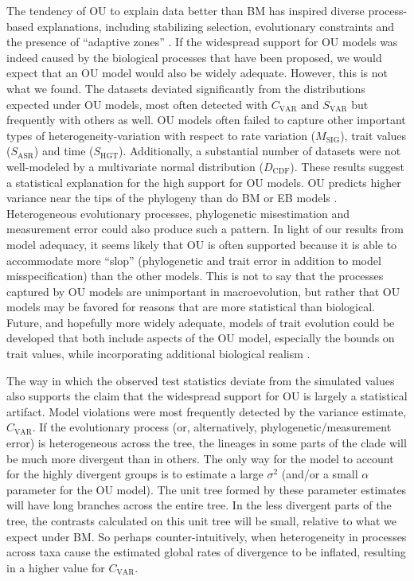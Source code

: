 The tendency of OU to explain data better than BM has inspired diverse process-based explanations, including stabilizing selection, evolutionary constraints and the presence of ``adaptive zones'' \citep{HansenMartins1996, ButlerKing2004, Hansen2012book, PennellHarmon}. 
If the widespread support for OU models was indeed caused by the biological processes that have been proposed, we would expect that an OU model would also be widely adequate. However, this is not what we found. The datasets deviated significantly from the distributions expected under OU models, most often detected with $C_{\text{VAR}}$ and $S_{\text{VAR}}$ but frequently with others as well. OU models often failed to capture other important types of heterogeneity-variation with respect to rate variation ($M_{\text{SIG}}$), trait values ($S_{\text{ASR}}$) and time ($S_{\text{HGT}}$). Additionally, a substantial number of datasets were not well-modeled by a multivariate normal distribution ($D_{\text{CDF}}$). These results suggest a statistical explanation for the high support for OU models. OU predicts higher variance near the tips of the phylogeny than do BM or EB models \citep[see figure 1 in][]{Harmon2010}. 
Heterogeneous evolutionary processes, phylogenetic misestimation and measurement error could also produce such a pattern. In light of our results from model adequacy, it seems likely that OU is often supported because it is able to accommodate more ``slop'' (phylogenetic and trait error in addition to model misspecification) than the other models.  This is not to say that the processes captured by OU models are unimportant in macroevolution, but rather that OU models may be favored for reasons that are more statistical than biological. Future, and hopefully more widely adequate, models of trait evolution could be developed that both include aspects of the OU model, especially the bounds on trait values, while incorporating additional biological realism \citep[for a recent example of such a model, see][]{NuismerHarmon}.

The way in which the observed test statistics deviate from the simulated values also supports the claim that the widespread support for OU is largely a statistical artifact. Model violations were most frequently detected by the variance estimate, $C_{\text{VAR}}$. If the evolutionary process (or, alternatively, phylogenetic/measurement error) is heterogeneous across the tree, the lineages in some parts of the clade will be much more divergent than in others. The only way for the model to account for the highly divergent groups is to estimate a large $\sigma^2$ (and/or a small $\alpha$ parameter for the OU model). The unit tree formed by these parameter estimates will have long branches across the entire tree. In the less divergent parts of the tree, the contrasts calculated on this unit tree will be small, relative to what we expect under BM. So perhaps counter-intuitively, when heterogeneity in processes across taxa cause the estimated global rates of divergence to be inflated, resulting in a higher value for $C_{\text{VAR}}$.

